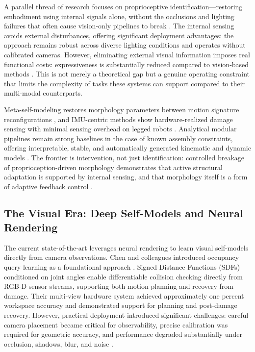 \documentclass[12pt,a4paper,oneside]{report}
\begin{document}
A parallel thread of research focuses on proprioceptive identification—restoring embodiment using internal signals alone, without the occlusions and lighting failures that often cause vision-only pipelines to break \cite{hu2024reconfigurable}. The internal sensing avoids external disturbances, offering significant deployment advantages: the approach remains robust across diverse lighting conditions and operates without calibrated cameras. However, eliminating external visual information imposes real functional costs: expressiveness is substantially reduced compared to vision-based methods \cite{farghdani2025robust}. This is not merely a theoretical gap but a genuine operating constraint that limits the complexity of tasks these systems can support compared to their multi-modal counterparts.

Meta-self-modeling restores morphology parameters between motion signature reconfigurations \cite{hu2024reconfigurable}, and IMU-centric methods show hardware-realized damage sensing with minimal sensing overhead on legged robots \cite{farghdani2025robust}. Analytical modular pipelines remain strong baselines in the case of known assembly constraints, offering interpretable, stable, and automatically generated kinematic and dynamic models \cite{dogra2022unified}. The frontier is intervention, not just identification: controlled breakage of proprioception-driven morphology demonstrates that active structural adaptation is supported by internal sensing, and that morphology itself is a form of adaptive feedback control \cite{xu2026antenna, yu2026kinematicself}.

\subsection{The Visual Era: Deep Self-Models and Neural Rendering}
\label{subsec:visual_era}

The current state-of-the-art leverages neural rendering to learn visual self-models directly from camera observations. Chen and colleagues introduced occupancy query learning as a foundational approach \cite{chen2022full}. Signed Distance Functions (SDFs) conditioned on joint angles enable differentiable collision checking directly from RGB-D sensor streams, supporting both motion planning and recovery from damage. Their multi-view hardware system achieved approximately one percent workspace accuracy and demonstrated support for planning and post-damage recovery. However, practical deployment introduced significant challenges: careful camera placement became critical for observability, precise calibration was required for geometric accuracy, and performance degraded substantially under occlusion, shadows, blur, and noise \cite{chen2022full}.
\end{document}
